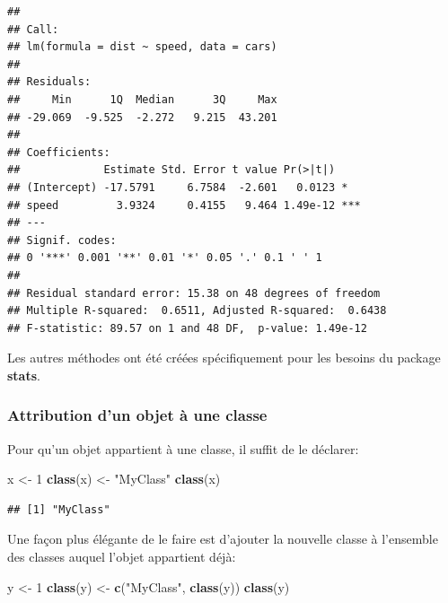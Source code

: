 \documentclass[
  12pt,
  french,
  a4paper,
  extrafontsizes,onecolumn,openright
  ]{memoir}
\newenvironment{Shaded}{\begin{snugshade}}{\end{snugshade}}
\newcommand{\DecValTok}[1]{\textcolor[rgb]{0.00,0.00,0.81}{#1}}
\newcommand{\FunctionTok}[1]{\textcolor[rgb]{0.13,0.29,0.53}{\textbf{#1}}}
\newcommand{\NormalTok}[1]{#1}
\newcommand{\OtherTok}[1]{\textcolor[rgb]{0.56,0.35,0.01}{#1}}
\newcommand{\StringTok}[1]{\textcolor[rgb]{0.31,0.60,0.02}{#1}}
\begin{document}
\begin{verbatim}
## 
## Call:
## lm(formula = dist ~ speed, data = cars)
## 
## Residuals:
##     Min      1Q  Median      3Q     Max 
## -29.069  -9.525  -2.272   9.215  43.201 
## 
## Coefficients:
##             Estimate Std. Error t value Pr(>|t|)    
## (Intercept) -17.5791     6.7584  -2.601   0.0123 *  
## speed         3.9324     0.4155   9.464 1.49e-12 ***
## ---
## Signif. codes:  
## 0 '***' 0.001 '**' 0.01 '*' 0.05 '.' 0.1 ' ' 1
## 
## Residual standard error: 15.38 on 48 degrees of freedom
## Multiple R-squared:  0.6511, Adjusted R-squared:  0.6438 
## F-statistic: 89.57 on 1 and 48 DF,  p-value: 1.49e-12
\end{verbatim}

\normalsize

Les autres méthodes ont été créées spécifiquement pour les besoins du package \textbf{stats}.

\subsubsection{Attribution d'un objet à une classe}\label{attribution-dun-objet-uxe0-une-classe}

Pour qu'un objet appartient à une classe, il suffit de le déclarer:

\scriptsize

\begin{Shaded}
\begin{Highlighting}[]
\NormalTok{x }\OtherTok{\textless{}{-}} \DecValTok{1}
\FunctionTok{class}\NormalTok{(x) }\OtherTok{\textless{}{-}} \StringTok{"MyClass"}
\FunctionTok{class}\NormalTok{(x)}
\end{Highlighting}
\end{Shaded}

\begin{verbatim}
## [1] "MyClass"
\end{verbatim}

\normalsize

Une façon plus élégante de le faire est d'ajouter la nouvelle classe à l'ensemble des classes auquel l'objet appartient déjà:

\scriptsize

\begin{Shaded}
\begin{Highlighting}[]
\NormalTok{y }\OtherTok{\textless{}{-}} \DecValTok{1}
\FunctionTok{class}\NormalTok{(y) }\OtherTok{\textless{}{-}} \FunctionTok{c}\NormalTok{(}\StringTok{"MyClass"}\NormalTok{, }\FunctionTok{class}\NormalTok{(y))}
\FunctionTok{class}\NormalTok{(y)}
\end{Highlighting}
\end{Shaded}
\end{document}
